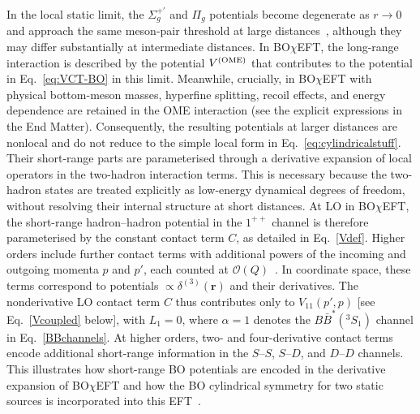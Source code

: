 \documentclass[aps,prl,showpacs,amsmath,twocolumn,superscriptaddress,floatfix,nofootinbib,notitlepage]{revtex4-2}
\newcommand{\ver}{{\bm r}}
\newcommand{\BOchiEFT}{BO$\chi$EFT\xspace}
\newcommand{\VOME}{V^{\rm (OME)}}
\begin{document}
In the local static limit, the $\Sigma_g^{+\prime}$ and $\Pi_g$ potentials become degenerate as $r\to 0$ and approach the same meson-pair threshold at large distances~\cite{Berwein:2024ztx}, although they may differ substantially at intermediate distances. In \BOchiEFT, the long-range interaction is described by the potential $\VOME$ that contributes to the potential in Eq.~\eqref{eq:VCT-BO} in this limit. Meanwhile, crucially, in BO$\chi$EFT with physical bottom-meson masses, hyperfine splitting, recoil effects, and energy dependence are retained in the OME interaction (see the explicit expressions in the End Matter). Consequently, the resulting potentials at larger distances are nonlocal and do not reduce to the simple local form in Eq.~\eqref{eq:cylindricalstuff}.
Their short-range parts are parameterised through a derivative expansion of local operators in the two-hadron interaction terms. This is necessary because the two-hadron states are treated explicitly as low-energy dynamical degrees of freedom, without resolving their internal structure at short distances.
At LO in \BOchiEFT, the short-range hadron--hadron potential in the $1^{++}$ channel is therefore parameterised by the constant contact term $C$, as detailed in Eq.~\eqref{Vdef}. Higher orders include further contact terms with additional powers of the incoming and outgoing momenta $p$ and $p'$, each counted at $\mathcal{O}(Q)$~\cite{Zhang:2026iyr}. In coordinate space, these terms correspond to potentials $\propto\delta^{(3)}(\ver)$ and their derivatives. 
The nonderivative LO contact term $C$ thus contributes only to $V_{11}(p',p)$ [see Eq.~\eqref{Vcoupled} below], with $L_1=0$, where $\alpha=1$ denotes the $B\bar{B}^*(^3S_1)$ channel in Eq.~\eqref{BBchannels}. At higher orders, two- and four-derivative contact terms encode additional short-range information in the $S$--$S$, $S$--$D$, and $D$--$D$ channels. This illustrates how short-range BO potentials are encoded in the derivative expansion of \BOchiEFT and how the BO cylindrical symmetry for two static sources is incorporated into this EFT~\cite{Zhang:2026iyr}.
\end{document}

